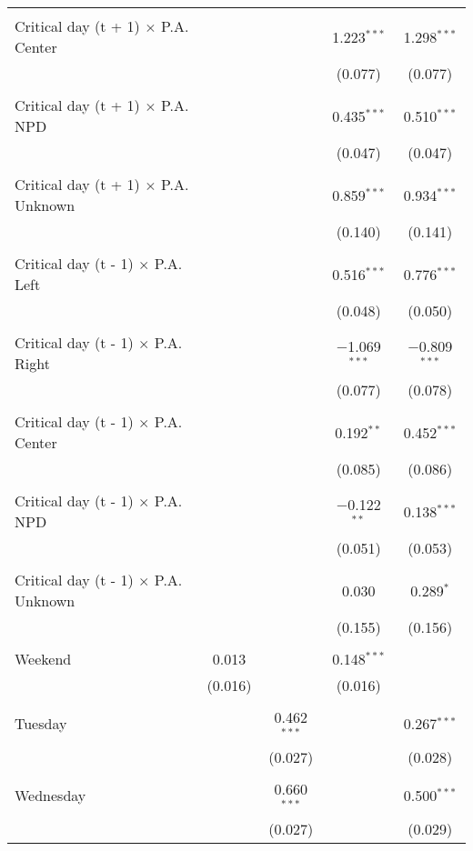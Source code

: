 \documentclass[
]{article}
\begin{document}
\begin{table}[!htbp]
{\begin{tabular}{@{\extracolsep{5pt}}lcccc}
  & & & & \\ 
 Critical day (t + 1) $\times$ P.A. Center &  &  & 1.223$^{***}$ & 1.298$^{***}$ \\ 
  &  &  & (0.077) & (0.077) \\ 
  & & & & \\ 
 Critical day (t + 1) $\times$ P.A. NPD &  &  & 0.435$^{***}$ & 0.510$^{***}$ \\ 
  &  &  & (0.047) & (0.047) \\ 
  & & & & \\ 
 Critical day (t + 1) $\times$ P.A. Unknown &  &  & 0.859$^{***}$ & 0.934$^{***}$ \\ 
  &  &  & (0.140) & (0.141) \\ 
  & & & & \\ 
 Critical day (t - 1) $\times$ P.A. Left &  &  & 0.516$^{***}$ & 0.776$^{***}$ \\ 
  &  &  & (0.048) & (0.050) \\ 
  & & & & \\ 
 Critical day (t - 1) $\times$ P.A. Right &  &  & $-$1.069$^{***}$ & $-$0.809$^{***}$ \\ 
  &  &  & (0.077) & (0.078) \\ 
  & & & & \\ 
 Critical day (t - 1) $\times$ P.A. Center &  &  & 0.192$^{**}$ & 0.452$^{***}$ \\ 
  &  &  & (0.085) & (0.086) \\ 
  & & & & \\ 
 Critical day (t - 1) $\times$ P.A. NPD &  &  & $-$0.122$^{**}$ & 0.138$^{***}$ \\ 
  &  &  & (0.051) & (0.053) \\ 
  & & & & \\ 
 Critical day (t - 1) $\times$ P.A. Unknown &  &  & 0.030 & 0.289$^{*}$ \\ 
  &  &  & (0.155) & (0.156) \\ 
  & & & & \\ 
 Weekend & 0.013 &  & 0.148$^{***}$ &  \\ 
  & (0.016) &  & (0.016) &  \\ 
  & & & & \\ 
 Tuesday &  & 0.462$^{***}$ &  & 0.267$^{***}$ \\ 
  &  & (0.027) &  & (0.028) \\ 
  & & & & \\ 
 Wednesday &  & 0.660$^{***}$ &  & 0.500$^{***}$ \\ 
  &  & (0.027) &  & (0.029) \\ 

\end{tabular}}
\end{table}
\end{document}
